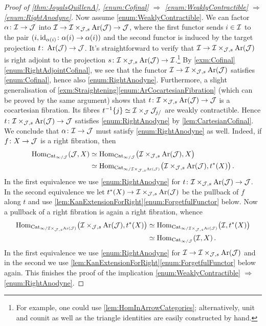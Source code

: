 \begin{proof}[Proof of \cref{thm:JoyalsQuillenA}, \cref{enum:Cofinal}  $\Rightarrow$ \cref{enum:WeaklyContractible} $\Rightarrow$ \cref{enum:RightAnodyne}]
	Now assume \cref{enum:WeaklyContractible}. We can factor $\alpha\colon \mathcal{I}\rightarrow \mathcal{J}$ into $\mathcal{I}\rightarrow \mathcal{I}\times_{\mathcal{J},s}\operatorname{Ar}(\mathcal{J})\rightarrow \mathcal{J}$, where the first functor sends $i\in \mathcal{I}$ to the pair $(i,\operatorname{id}_{\alpha(i)}\colon \alpha(i)\rightarrow \alpha(i))$ and the second functor is induced by the target projection $t\colon \operatorname{Ar}(\mathcal{J})\rightarrow \mathcal{J}$. It's straightforward to verify that $\mathcal{I}\rightarrow \mathcal{I}\times_{\mathcal{J},s}\operatorname{Ar}(\mathcal{J})$ is right adjoint to the projection $s\colon \mathcal{I}\times_{\mathcal{J},s}\operatorname{Ar}(\mathcal{J})\rightarrow \mathcal{I}$.\footnote{For example, one could use \cref{lem:HomInArrowCategories}; alternatively, unit and counit as well as the triangle identities are easily constructed by hand.} By \cref{exm:Cofinal}\cref{enum:RightAdjointCofinal}, we see that the functor $\mathcal{I}\rightarrow \mathcal{I}\times_{\mathcal{J},s}\operatorname{Ar}(\mathcal{J})$ satisfies \cref{enum:Cofinal}, hence also \cref{enum:RightAnodyne}. Furthermore, a slight generalisation of \cref{exm:Straightening}\cref{enum:ArCocartesianFibration} (which can be proved by the same argument) shows that $t\colon\mathcal{I}\times_{\mathcal{J},s}\operatorname{Ar}(\mathcal{J})\rightarrow \mathcal{J}$ is a cocartesian fibration. Its fibres $t^{-1}\{j\}\simeq \mathcal{I}\times_{\mathcal{J}} \mathcal{J}_{j/}$ are weakly contractible. Hence $t\colon\mathcal{I}\times_{\mathcal{J},s}\operatorname{Ar}(\mathcal{J})\rightarrow \mathcal{J}$ satisfies \cref{enum:RightAnodyne} by \cref{lem:CartesianCofinal}. We conclude that $\alpha\colon \mathcal{I}\rightarrow \mathcal{J}$ must satisfy \cref{enum:RightAnodyne} as well. Indeed, if $f\colon X\rightarrow \mathcal{J}$ is a right fibration, then
	\begin{align*}
		\operatorname{Hom}_{\mathrm{Cat}_{\infty/\mathcal{J}}}(\mathcal{J},X)&\simeq \operatorname{Hom}_{\mathrm{Cat}_{\infty/\mathcal{J}}}\bigl(\mathcal{I}\times_{\mathcal{J},s}\operatorname{Ar}(\mathcal{J}),X\bigr)\\
		&\simeq  \operatorname{Hom}_{\mathrm{Cat}_{\infty/\mathcal{I}\times_{\mathcal{J},s}\operatorname{Ar}(\mathcal{J})}}\bigl(\mathcal{I}\times_{\mathcal{J},s}\operatorname{Ar}(\mathcal{J}),t^*(X)\bigr)\,.
	\end{align*}
	In the first equivalence we use \cref{enum:RightAnodyne} for $t\colon\mathcal{I}\times_{\mathcal{J},s}\operatorname{Ar}(\mathcal{J})\rightarrow \mathcal{J}$. In the second equivalence we let $t^*(X)\rightarrow \mathcal{I}\times_{\mathcal{J},s}\operatorname{Ar}(\mathcal{J})$ be the pullback of $f$ along $t$ and use \cref{lem:KanExtensionForRight}\cref{enum:ForgetfulFunctor} below. Now a pullback of a right fibration is again a right fibration, whence
	\begin{align*}
		\operatorname{Hom}_{\mathrm{Cat}_{\infty/\mathcal{I}\times_{\mathcal{J},s}\operatorname{Ar}(\mathcal{J})}}\bigl(\mathcal{I}\times_{\mathcal{J},s}\operatorname{Ar}(\mathcal{J}),t^*(X)\bigr)&\simeq \operatorname{Hom}_{\mathrm{Cat}_{\infty/\mathcal{I}\times_{\mathcal{J},s}\operatorname{Ar}(\mathcal{J})}}\bigl(\mathcal{I},t^*(X)\bigr)\\
		&\simeq \operatorname{Hom}_{\mathrm{Cat}_{\infty/\mathcal{J}}}(\mathcal{I},X)\,.
	\end{align*}
	In the first equivalence we use \cref{enum:RightAnodyne} for $\mathcal{I}\rightarrow \mathcal{I}\times_{\mathcal{J},s}\operatorname{Ar}(\mathcal{J})$ and in the second we use \cref{lem:KanExtensionForRight}\cref{enum:ForgetfulFunctor} below again. This finishes the proof of the implication \cref{enum:WeaklyContractible} $\Rightarrow$ \cref{enum:RightAnodyne}.
\end{proof}

